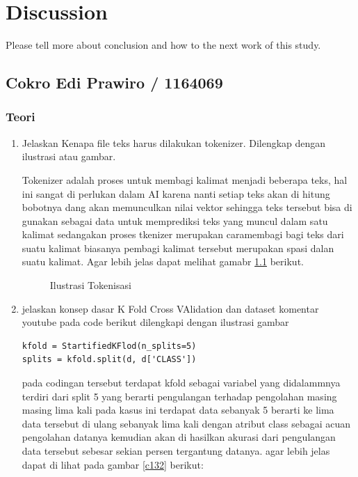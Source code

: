 \chapter{Discussion}
Please tell more about conclusion and how to the next work of this study.

\section{Cokro Edi Prawiro / 1164069}
\subsection{Teori}

\begin{enumerate}

\item Jelaskan Kenapa file teks harus dilakukan tokenizer. Dilengkap dengan ilustrasi atau gambar.\par
Tokenizer adalah proses untuk membagi kalimat menjadi beberapa teks, hal ini sangat di perlukan dalam AI karena nanti setiap teks akan di hitung bobotnya dang akan memunculkan nilai vektor sehingga teks tersebut bisa di gunakan sebagai data untuk memprediksi teks yang muncul dalam satu kalimat sedangakan proses tkenizer merupakan caramembagi bagi teks dari suatu kalimat biasanya pembagi kalimat tersebut merupakan spasi dalan suatu kalimat. Agar lebih jelas dapat melihat gamabr \ref{c131} berikut. 

\begin{figure}[!htbp]
      \caption{Ilustrasi Tokenisasi}
      \label{c131}
      \end{figure}

\item jelaskan konsep dasar K Fold Cross VAlidation dan dataset komentar youtube pada code berikut dilengkapi dengan ilustrasi gambar  
\begin{verbatim}
kfold = StartifiedKFlod(n_splits=5)
splits = kfold.split(d, d['CLASS'])
\end{verbatim}
pada codingan tersebut terdapat kfold sebagai variabel yang didalammnya terdiri dari split 5 yang berarti pengulangan terhadap pengolahan masing masing lima kali pada kasus ini terdapat data sebanyak 5 berarti ke lima data tersebut di ulang sebanyak lima kali dengan atribut class sebagai acuan pengolahan datanya kemudian akan di hasilkan akurasi dari pengulangan data tersebut sebesar sekian persen tergantung datanya. agar lebih jelas dapat di lihat pada gambar \ref{c132}  berikut:


\end{enumerate}
